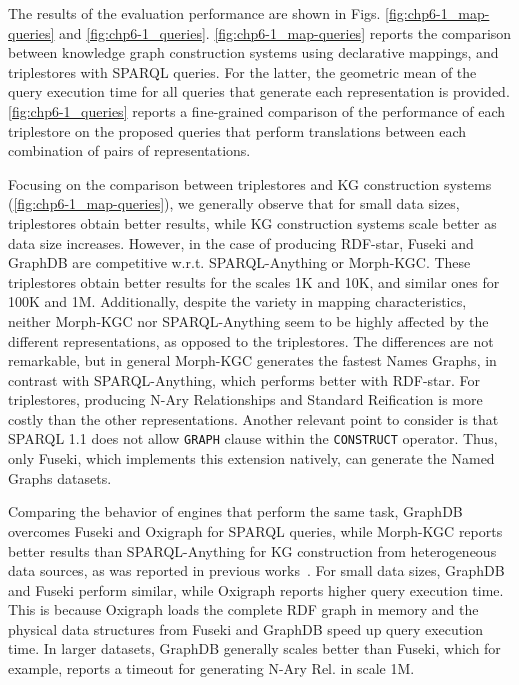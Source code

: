 The results of the evaluation performance are shown in Figs. \ref{fig:chp6-1_map-queries} and \ref{fig:chp6-1_queries}. \cref{fig:chp6-1_map-queries} reports the comparison between knowledge graph construction systems using declarative mappings, and triplestores with SPARQL queries. For the latter, the geometric mean of the query execution time for all queries that generate each representation is provided. \cref{fig:chp6-1_queries} reports a fine-grained comparison of the performance of each triplestore on the proposed queries that perform translations between each combination of pairs of representations.

Focusing on the comparison between triplestores and KG construction systems (\cref{fig:chp6-1_map-queries}), we generally observe that for small data sizes, triplestores obtain better results, while KG construction systems scale better as data size increases. However, in the case of producing RDF-star, Fuseki and GraphDB are competitive w.r.t. SPARQL-Anything or Morph-KGC. These triplestores obtain better results for the scales 1K and 10K, and similar ones for 100K and 1M. Additionally, despite the variety in mapping characteristics, neither Morph-KGC nor SPARQL-Anything seem to be highly affected by the different representations, as opposed to the triplestores. The differences are not remarkable, but in general Morph-KGC generates the fastest Names Graphs, in contrast with SPARQL-Anything, which performs better with RDF-star. For triplestores, producing N-Ary Relationships and Standard Reification is more costly than the other representations. Another relevant point to consider is that SPARQL 1.1 does not allow \texttt{GRAPH} clause within the \texttt{CONSTRUCT} operator. Thus, only Fuseki, which implements this extension natively, can generate the Named Graphs datasets.

Comparing the behavior of engines that perform the same task, GraphDB overcomes Fuseki and Oxigraph for SPARQL queries, while Morph-KGC reports better results than SPARQL-Anything for KG construction from heterogeneous data sources, as was reported in previous works~\cite{arenas2023morphstar}.
For small data sizes, GraphDB and Fuseki perform similar, while Oxigraph reports higher query execution time. This is because Oxigraph loads the complete RDF graph in memory and the physical data structures from Fuseki and GraphDB speed up query execution time. In larger datasets, GraphDB generally scales better than Fuseki, which for example, reports a timeout for generating N-Ary Rel. in scale 1M. 

